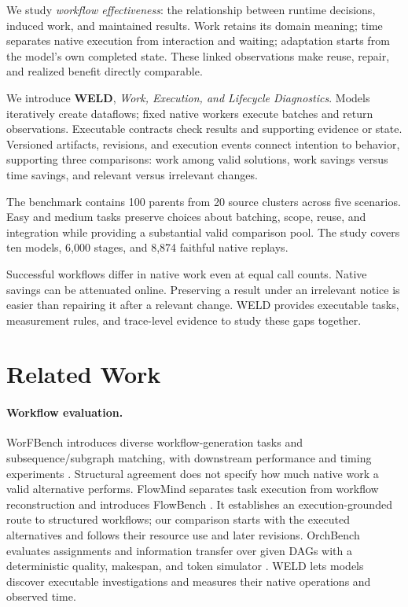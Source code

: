 \documentclass[11pt]{article}
\begin{document}
We study \emph{workflow effectiveness}: the relationship between runtime decisions, induced work, and maintained results. Work retains its domain meaning; time separates native execution from interaction and waiting; adaptation starts from the model's own completed state. These linked observations make reuse, repair, and realized benefit directly comparable.

We introduce \textbf{WELD}, \emph{Work, Execution, and Lifecycle Diagnostics}. Models iteratively create dataflows; fixed native workers execute batches and return observations. Executable contracts check results and supporting evidence or state. Versioned artifacts, revisions, and execution events connect intention to behavior, supporting three comparisons: work among valid solutions, work savings versus time savings, and relevant versus irrelevant changes.

The benchmark contains 100 parents from 20 source clusters across five scenarios. Easy and medium tasks preserve choices about batching, scope, reuse, and integration while providing a substantial valid comparison pool. The study covers ten models, 6,000 stages, and 8,874 faithful native replays.

Successful workflows differ in native work even at equal call counts. Native savings can be attenuated online. Preserving a result under an irrelevant notice is easier than repairing it after a relevant change. WELD provides executable tasks, measurement rules, and trace-level evidence to study these gaps together.

\section{Related Work}
\paragraph{Workflow evaluation.}
WorFBench introduces diverse workflow-generation tasks and subsequence/subgraph matching, with downstream performance and timing experiments \citep{qiao2025worfbench}. Structural agreement does not specify how much native work a valid alternative performs. FlowMind separates task execution from workflow reconstruction and introduces FlowBench \citep{liu2026flowmind}. It establishes an execution-grounded route to structured workflows; our comparison starts with the executed alternatives and follows their resource use and later revisions. OrchBench evaluates assignments and information transfer over given DAGs with a deterministic quality, makespan, and token simulator \citep{ren2026orchbench}. WELD lets models discover executable investigations and measures their native operations and observed time.
\end{document}
